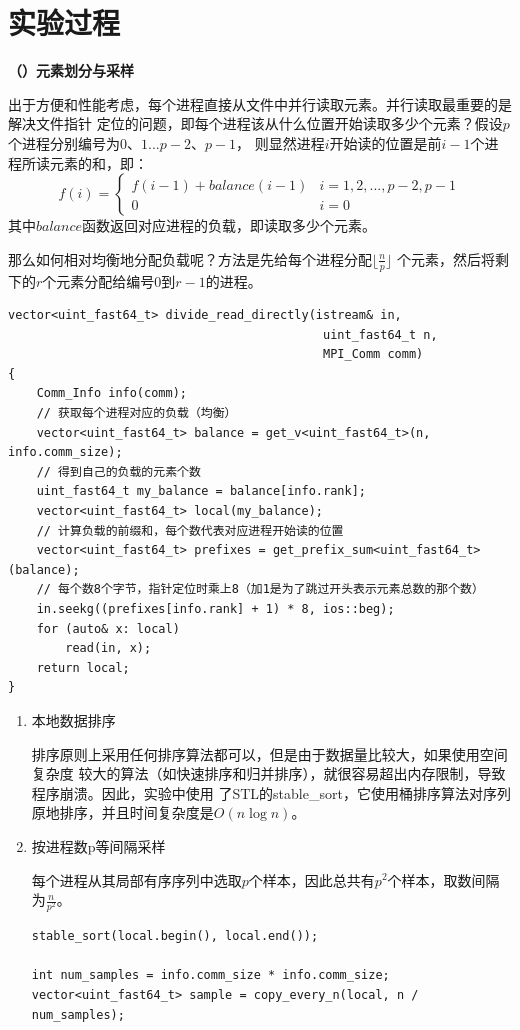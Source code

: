 \documentclass[10pt,letterpaper]{ctexart}
\newcommand\zhsubsec[1]{{%
\bfseries{
\stepcounter{subsection}（\zhnum{subsection}）{#1}}
\vspace{0.1pt}%
}}
\begin{document}
\section{实验过程}
\zhsubsec{元素划分与采样}

出于方便和性能考虑，每个进程直接从文件中并行读取元素。并行读取最重要的是解决文件指针
定位的问题，即每个进程该从什么位置开始读取多少个元素？假设$p$个进程分别编号为$0、1...p-2、p-1$，
则显然进程$i$开始读的位置是前$i-1$个进程所读元素的和，即：
\begin{equation}
  f(i) =
    \begin{cases}
      f(i-1) + balance(i-1) & i=1, 2, ..., p-2, p-1\\
      0 & i=0
    \end{cases}
\end{equation}
其中$balance$函数返回对应进程的负载，即读取多少个元素。
\par 那么如何相对均衡地分配负载呢？方法是先给每个进程分配$\lfloor\frac{n}{p}\rfloor$
个元素，然后将剩下的$r$个元素分配给编号$0$到$r-1$的进程。
\begin{lstlisting}[caption=并行读取元素,label={code:read},captionpos=b]
vector<uint_fast64_t> divide_read_directly(istream& in, 
                                            uint_fast64_t n, 
                                            MPI_Comm comm) 
{
    Comm_Info info(comm);
    // 获取每个进程对应的负载（均衡）
    vector<uint_fast64_t> balance = get_v<uint_fast64_t>(n, info.comm_size);
    // 得到自己的负载的元素个数
    uint_fast64_t my_balance = balance[info.rank];
    vector<uint_fast64_t> local(my_balance);
    // 计算负载的前缀和，每个数代表对应进程开始读的位置
    vector<uint_fast64_t> prefixes = get_prefix_sum<uint_fast64_t>(balance);
    // 每个数8个字节，指针定位时乘上8（加1是为了跳过开头表示元素总数的那个数）
    in.seekg((prefixes[info.rank] + 1) * 8, ios::beg);
    for (auto& x: local)
        read(in, x);
    return local;
}
\end{lstlisting}

\begin{enumerate}[itemindent=4em,label=\arabic*、]
\item 本地数据排序
\par \qquad 排序原则上采用任何排序算法都可以，但是由于数据量比较大，如果使用空间复杂度
较大的算法（如快速排序和归并排序），就很容易超出内存限制，导致程序崩溃。因此，实验中使用
了STL的stable\_sort，它使用桶排序算法对序列原地排序，并且时间复杂度是$O(n \log n)$。
\item 按进程数p等间隔采样
\par \qquad 每个进程从其局部有序序列中选取$p$个样本，因此总共有$p^2$个样本，取数间隔为$\frac{n}{p^2}$。
\begin{lstlisting}[caption=排序与采样,label={code:local_sample},captionpos=b]
stable_sort(local.begin(), local.end());
  
int num_samples = info.comm_size * info.comm_size;
vector<uint_fast64_t> sample = copy_every_n(local, n / num_samples);
\end{lstlisting}

\end{enumerate}
\end{document}
